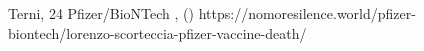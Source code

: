           {Terni, }
          {24}
          {Pfizer/BioNTech}
          {}
          {
            ,
             ()
          }
          {https://nomoresilence.world/pfizer-biontech/lorenzo-scorteccia-pfizer-vaccine-death/}
